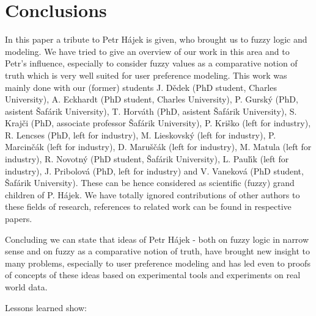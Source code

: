 \section{Conclusions}
In this paper a tribute to Petr H\'{a}jek is given, who brought us to fuzzy logic and modeling. We have tried to give an overview of our work in this area and to Petr's influence, especially to consider fuzzy values as a comparative notion of truth which is very well suited for user preference modeling. 
This work was mainly done with our (former) students
J. D\v edek (PhD student, Charles University),
A. Eckhardt  (PhD student, Charles University),
P. Gursk\'y (PhD, asistent \v Saf\'arik University),
T. Horv\'ath (PhD, asistent \v Saf\'arik University),
S. Kraj\v ci (PhD, associate professor \v Saf\'arik University),
P. Kri\v sko (left for industry),
R. Lencses (PhD, left for industry),
M. Lieskovsk\'y (left for industry),
P. Marcin\v c\'ak (left for industry),
D. Maru\v s\v c\'ak (left for industry),
M. Matula (left for industry),
R. Novotn\'y (PhD student, \v Saf\'arik University),
L. Paul\'\i k (left for industry),
J. Pribolov\'a (PhD, left for industry) and
V. Vanekov\'a (PhD student, \v Saf\'arik University).
These can be hence considered as scientific (fuzzy) grand children of P. H\'ajek.
We have totally ignored contributions of other authors to these fields of research, references to related work can be found in respective papers. 

     Concluding we can state that ideas of Petr H\'{a}jek - both on fuzzy logic in narrow sense and on fuzzy as a comparative notion of truth, have brought new insight to many problems, especially to user preference modeling and has led  even to proofs of concepts of these ideas based on experimental tools and experiments on real world data.
     
          Lessons learned show:

